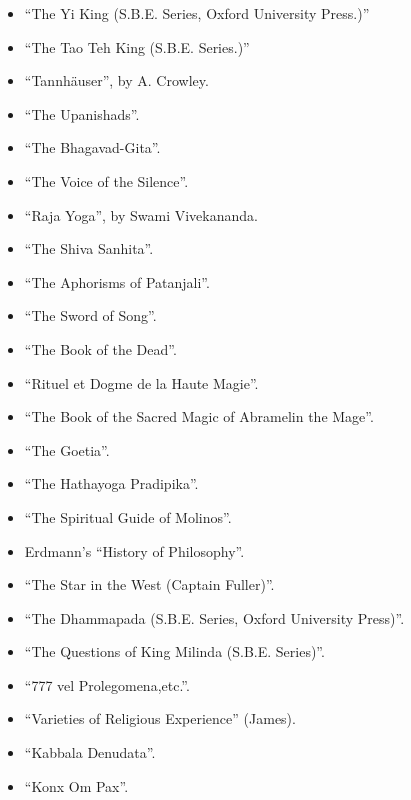 \begin{itemize}[label={}]
\item \enquote{The Yi King (S.B.E. Series, Oxford University Press.)}
\item \enquote{The Tao Teh King (S.B.E. Series.)}
\item \enquote{Tannh\"{a}user}, by A. Crowley.
\item \enquote{The Upanishads}.
\item \enquote{The Bhagavad-Gita}.
\item \enquote{The Voice of the Silence}.
\item \enquote{Raja Yoga}, by Swami Vivekananda.
\item \enquote{The Shiva Sanhita}.
\item \enquote{The Aphorisms of Patanjali}.
\item \enquote{The Sword of Song}.
\item \enquote{The Book of the Dead}.
\item \enquote{Rituel et Dogme de la Haute Magie}.
\item \enquote{The Book of the Sacred Magic of Abramelin the Mage}.
\item \enquote{The Goetia}.
\item \enquote{The Hathayoga Pradipika}.
\item \enquote{The Spiritual Guide of Molinos}.
\item Erdmann's \enquote{History of Philosophy}.
\item \enquote{The Star in the West (Captain Fuller)}.
\item \enquote{The Dhammapada (S.B.E. Series, Oxford University Press)}.
\item \enquote{The Questions of King Milinda (S.B.E. Series)}.
\item \enquote{777 vel Prolegomena,etc.}.
\item \enquote{Varieties of Religious Experience} (James).
\item \enquote{Kabbala Denudata}.
\item \enquote{Konx Om Pax}.
\end{itemize}

